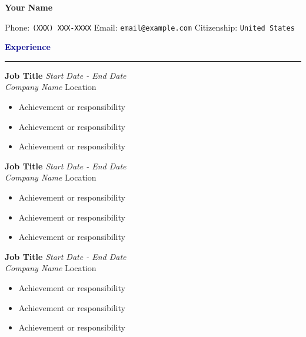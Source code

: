 \documentclass[11pt]{article}
\newcommand{\sectionheader}[1]{%
  \textcolor{darkblue}{\textbf{\large #1}}
  \vspace{-12pt}
  \hrule
  \vspace{8pt}
}
\newcommand{\jobentry}[4]{%
  \textbf{#1} \hfill \textit{#2}\\
  \textit{#3} \hfill #4\\
}
\begin{document}
\begin{center}
  {\LARGE \textbf{Your Name}}
\end{center}

\begin{center}
  \small
  Phone: \texttt{(XXX) XXX-XXXX} \hspace{1cm}
  Email: \texttt{email@example.com} \hspace{1cm}
  Citizenship: \texttt{United States}
\end{center}

\vspace{12pt}

\sectionheader{Experience}
\vspace{6pt}

\jobentry{Job Title}{Start Date - End Date}{Company Name}{Location}
\begin{itemize}[left=18pt, noitemsep]
  \item Achievement or responsibility
  \item Achievement or responsibility
  \item Achievement or responsibility
\end{itemize}
\vspace{8pt}

\jobentry{Job Title}{Start Date - End Date}{Company Name}{Location}
\begin{itemize}[left=18pt, noitemsep]
  \item Achievement or responsibility
  \item Achievement or responsibility
  \item Achievement or responsibility
\end{itemize}
\vspace{8pt}

\jobentry{Job Title}{Start Date - End Date}{Company Name}{Location}
\begin{itemize}[left=18pt, noitemsep]
  \item Achievement or responsibility
  \item Achievement or responsibility
  \item Achievement or responsibility
\end{itemize}
\end{document}
